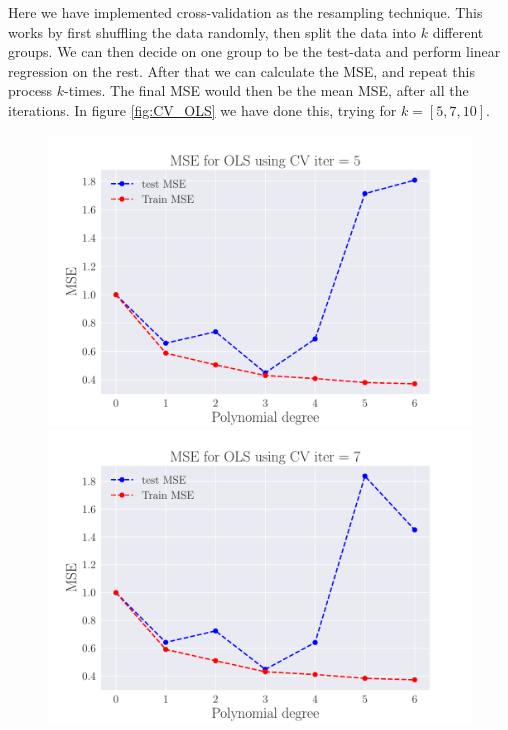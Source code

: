 \documentclass[reprint,english,notitlepage,aps,nobalancelastpage,nofootinbib]{revtex4-1}  %
\begin{document}
Here we have implemented cross-validation as the resampling technique. This works by first shuffling the data randomly, then split the data into $k$ different groups. We can then decide on one group to be the test-data and perform linear regression on the rest. After that we can calculate the MSE, and repeat this process $k$-times. The final MSE would then be the mean MSE, after all the iterations. In figure \ref{fig:CV_OLS} we have done this, trying for $k = [5,7,10]$.

\begin{figure}[H]
	\includegraphics[width=\linewidth]{MSE_OLS_n30_eps02_pol6_CV_re5.pdf}
	\endminipage\hfill
	\includegraphics[width=\linewidth]{MSE_OLS_n30_eps02_pol6_CV_re7.pdf}
	\endminipage\hfill

\end{figure}
\end{document}
